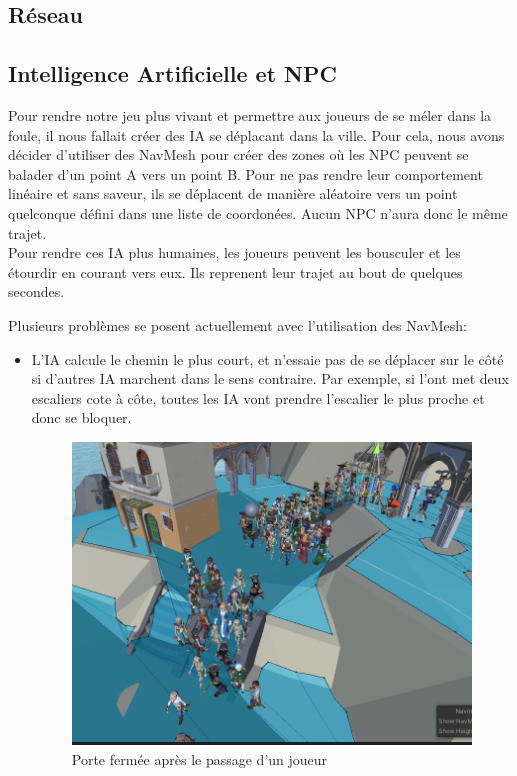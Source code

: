 \documentclass[french, 12pt]{article}
\begin{document}
    \subsection{Réseau}


    \subsection{Intelligence Artificielle et NPC}

    Pour rendre notre jeu plus vivant et permettre aux joueurs de se méler dans la foule,
    il nous fallait créer des IA se déplacant dans la ville.
    Pour cela, nous avons décider d'utiliser des NavMesh pour créer des zones où les 
    NPC peuvent se balader d'un point A vers un point B.
    Pour ne pas rendre leur comportement linéaire et sans saveur,
    ils se déplacent de manière aléatoire  vers un point quelconque défini dans une liste de coordonées.
    Aucun NPC n'aura donc le même trajet.\\

    Pour rendre ces IA plus humaines, les joueurs peuvent les bousculer et les étourdir en courant vers eux.
    Ils reprenent leur trajet au bout de quelques secondes.


    Plusieurs problèmes se posent actuellement avec l'utilisation des NavMesh:
    \begin{itemize}
        \item L'IA calcule le chemin le plus court, et n'essaie pas de se déplacer sur le côté si d'autres IA marchent dans le sens contraire. Par exemple, si l'ont met deux escaliers cote à côte, toutes les IA vont prendre l'escalier le plus proche et donc se bloquer.\\
        \begin{figure}[hbt!]
            \centering
            \includegraphics[scale=0.5]{ia_stairs_bug.png}
            \caption{Porte fermée après le passage d'un joueur}
        \end{figure}
    \end{itemize}
\end{document}
